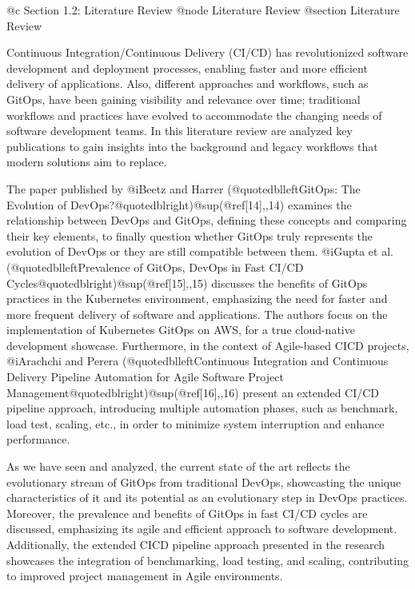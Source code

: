 @c Section 1.2: Literature Review
@node Literature Review
@section Literature Review

Continuous Integration/Continuous Delivery (CI/CD) has revolutionized software development and deployment processes, enabling faster and more efficient delivery of applications. Also, different approaches and workflows, such as GitOps, have been gaining visibility and relevance over time; traditional workflows and practices have evolved to accommodate the changing needs of software development teams. In this literature review are analyzed key publications to gain insights into the background and legacy workflows that modern solutions aim to replace.

The paper published by @i{Beetz and Harrer (@quotedblleft{}GitOps: The Evolution of DevOps?@quotedblright{})}@sup{(@ref{[14],,14})} examines the relationship between DevOps and GitOps, defining these concepts and comparing their key elements, to finally question whether GitOps truly represents the evolution of DevOps or they are still compatible between them.
@i{Gupta et al. (@quotedblleft{}Prevalence of GitOps, DevOps in Fast CI/CD Cycles@quotedblright{})}@sup{(@ref{[15],,15})} discusses the benefits of GitOps practices in the Kubernetes environment, emphasizing the need for faster and more frequent delivery of software and applications. The authors focus on the implementation of Kubernetes GitOps on AWS, for a true cloud-native development showcase.
Furthermore, in the context of Agile-based CICD projects, @i{Arachchi and Perera (@quotedblleft{}Continuous Integration and Continuous Delivery Pipeline Automation for Agile Software Project Management@quotedblright{})}@sup{(@ref{[16],,16})} present an extended CI/CD pipeline approach, introducing multiple automation phases, such as benchmark, load test, scaling, etc., in order to minimize system interruption and enhance performance.

As we have seen and analyzed, the current state of the art reflects the evolutionary stream of GitOps from traditional DevOps, showcasting the unique characteristics of it and its potential as an evolutionary step in DevOps practices. Moreover, the prevalence and benefits of GitOps in fast CI/CD cycles are discussed, emphasizing its agile and efficient approach to software development. Additionally, the extended CICD pipeline approach presented in the research showcases the integration of benchmarking, load testing, and scaling, contributing to improved project management in Agile environments.
